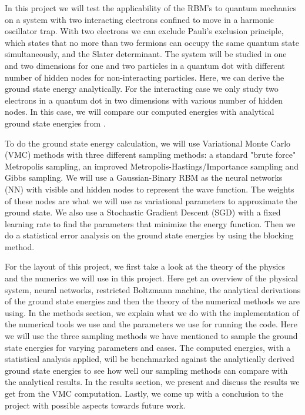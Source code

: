 \documentclass[12pt,a4paper,english]{article}
\begin{document}
In this project we will test the applicability of the RBM's to quantum mechanics on a system with two interacting electrons confined to move in a harmonic oscillator trap. With two electrons we can exclude Pauli's exclusion principle, which states that no more than two fermions can occupy the same quantum state simultaneously, and the Slater determinant. The system will be studied in one and two dimensions for one and two particles in a quantum dot with different number of hidden nodes for non-interacting particles. Here, we can derive the ground state energy analytically. For the interacting case we only study two electrons in a quantum dot in two dimensions with various number of hidden nodes. In this case, we will compare our computed energies with analytical ground state energies from \citet{taut1993two}.

To do the ground state energy calculation, we will use Variational Monte Carlo (VMC) methods with three different sampling methods: a standard "brute force" Metropolis sampling, an improved Metropolis-Hastings/Importance sampling and Gibbs sampling. We will use a Gaussian-Binary RBM as the neural networks (NN) with visible and hidden nodes to represent the wave function. The weights of these nodes are what we will use as variational parameters to approximate the ground state. We also use a Stochastic Gradient Descent (SGD) with a fixed learning rate to find the parameters that minimize the energy function. Then we do a statistical error analysis on the ground state energies by using the blocking method.

For the layout of this project, we first take a look at the theory of the physics and the numerics we will use in this project. Here get an overview of the physical system, neural networks, restricted Boltzmann machine, the analytical derivations of the ground state energies and then the theory of the numerical methods we are using. In the methods section, we explain what we do with the implementation of the numerical tools we use and the parameters we use for running the code. Here we will use the three sampling methods we have mentioned to sample the ground state energies for varying parameters and cases. The computed energies, with a statistical analysis applied, will be benchmarked against the analytically derived ground state energies to see how well our sampling methods can compare with the analytical results. In the results section, we present and discuss the results we get from the VMC computation. Lastly, we come up with a conclusion to the project with possible aspects towards future work.
\end{document}
